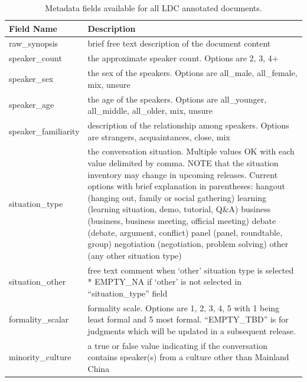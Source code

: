\documentclass[12pt]{article}
\begin{document}
\begin{table}[H]
\centering
\caption{Metadata fields available for all LDC annotated documents.}
\begin{tabular}{p{}p{}}
\toprule
\textbf{Field Name} & \textbf{Description} \\
\midrule
raw\_synopsis & brief free text description of the document content \\
\hline
speaker\_count & the approximate speaker count. Options are 2, 3, 4+\\
\hline
speaker\_sex & the sex of the speakers. Options are all\_male, all\_female, mix, unsure\\
\hline
speaker\_age & the age of the speakers. Options are all\_younger, all\_middle, all\_older, mix, unsure\\
\hline
speaker\_familiarity & description of the relationship among speakers. Options are strangers, acquaintances, close, mix\\
\hline
situation\_type & the conversation situation. Multiple values OK with each value delimited by comma. NOTE that the situation inventory may change in upcoming releases. Current options with brief explanation in parentheses: hangout (hanging out, family or social gathering) learning (learning situation, demo, tutorial, Q\&A) business (business, business meeting, official meeting) debate (debate, argument, conflict) panel (panel, roundtable, group) negotiation (negotiation, problem solving) other (any other situation type)\\
\hline
situation\_other & free text comment when `other' situation type is selected * EMPTY\_NA if `other' is not selected in ``situation\_type'' field\\
\hline
formality\_scalar & formality scale. Options are 1, 2, 3, 4, 5 with 1 being least formal and 5 most formal. ``EMPTY\_TBD'' is for judgments which will be updated in a subsequent release.\\
\hline
minority\_culture & a true or false value indicating if the conversation contains speaker(s) from a culture other than Mainland China\\
\end{tabular}
\label{tab:metadata}
\end{table}
\end{document}
